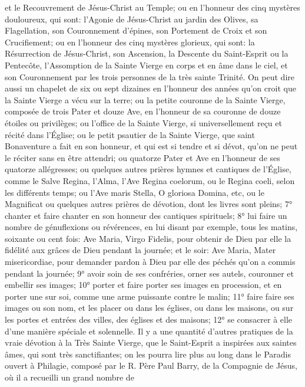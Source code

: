 et le Recouvrement de Jésus-Christ au Temple; ou en l'honneur des cinq mystères douloureux, qui sont: l'Agonie
de Jésus-Christ au jardin des Olives, sa Flagellation, son Couronnement d'épines, son Portement de Croix et son
Crucifiement; ou en l'honneur des cinq mystères glorieux, qui sont: la Résurrection de Jésus-Christ, son
Ascension, la Descente du Saint-Esprit ou la Pentecôte, l'Assomption de la Sainte Vierge en corps et en âme dans
le ciel, et son Couronnement par les trois personnes de la très sainte Trinité. On peut dire aussi un chapelet de six
ou sept dizaines en l'honneur des années qu'on croit que la Sainte Vierge a vécu sur la terre; ou la petite couronne
de la Sainte Vierge, composée de trois Pater et douze Ave, en l'honneur de sa couronne de douze étoiles ou
privilèges; ou l'office de la Sainte Vierge, si universellement reçu et récité dans l'Église; ou le petit psautier de la
Sainte Vierge, que saint Bonaventure a fait en son honneur, et qui est si tendre et si dévot, qu'on ne peut le réciter
sans en être attendri; ou quatorze Pater et Ave en l'honneur de ses quatorze allégresses; ou quelques autres
prières hymnes et cantiques de l'Église, comme le Salve Regina, l'Alma, l'Ave Regina coelorum, ou le Regina
coeli, selon les différents temps; ou l'Ave maris Stella, O gloriosa Domina, etc, ou le Magnificat ou quelques autres
prières de dévotion, dont les livres sont pleins; 7° chanter et faire chanter en son honneur des cantiques spirituels;
8° lui faire un nombre de génuflexions ou révérences, en lui disant par exemple, tous les matins, soixante ou cent
fois: Ave Maria, Virgo Fidelis, pour obtenir de Dieu par elle la fidélité aux grâces de Dieu pendant la journée; et le
soir: Ave Maria, Mater misericordiae, pour demander pardon à Dieu par elle des péchés qu'on a commis pendant
la journée; 9° avoir soin de ses confréries, orner ses autels, couronner et embellir ses images; 10° porter et faire
porter ses images en procession, et en porter une sur soi, comme une arme puissante contre le malin; 11° faire
faire ses images ou son nom, et les placer ou dans les églises, ou dans les maisons, ou sur les portes et entrées
des villes, des églises et des maisons; 12° se consacrer à elle d'une manière spéciale et solennelle.
 Il y a une quantité d'autres pratiques de la vraie dévotion à la Très Sainte Vierge, que le Saint-Esprit a
inspirées aux saintes âmes, qui sont très sanctifiantes; on les pourra lire plus au long dans le Paradis ouvert à
Philagie, composé par le R. Père Paul Barry, de la Compagnie de Jésus, où il a recueilli un grand nombre de
